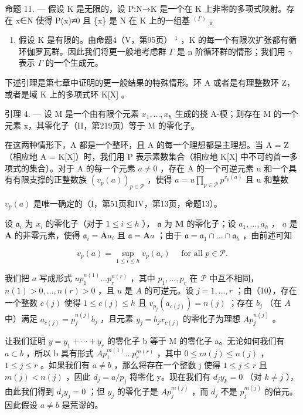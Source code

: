 命题 11. --- 假设 K 是无限的，设 P:N→K 是一个在 K 上非零的多项式映射。存在 x∈N 使得 P(x)≠0 且 \{x\} 是 N 在 K 上的一组基 \(^{(\Gamma)}\) 。

\begin{enumerate}
\def\labelenumi{\Alph{enumi})}
\setcounter{enumi}{1}
\tightlist
\item
  假设 K 是有限的。由命题4（V，第95页） \(^{1}\) ，K 的每一个有限次扩张都有循环伽罗瓦群。因此我们将更一般地考虑群 \(\Gamma\) 是 n 阶循环群的情形；我们用 \(\gamma\) 表示 \(\Gamma\) 的一个生成元。
\end{enumerate}

下述引理是第七章中证明的更一般结果的特殊情形。环 A 或者是有理整数环 Z，或者是域 K 上的多项式环 K{[}X{]} 。

引理 4. --- 设 M 是一个由有限个元素 \(x_{1}, \ldots, x_{h}\) 生成的挠 A-模；则存在 M 的一个元素 x，其零化子（II，第219页）等于 M 的零化子。

在这两种情形下，A 都是一个整环，且 A 的每一个理想都是主理想。当 A = Z（相应地 A = K{[}X{]}）时，我们用 P 表示素数集合（相应地 K{[}X{]} 中不可约首一多项式的集合）。对于 A 的每一个元素 \(a \neq 0\) ，存在 A 的一个可逆元素 u 和一个具有有限支撑的正整数族 \((v_{p}(a))_{p \in \mathcal{P}}\) ，使得 \(a = u \prod_{p \in \mathcal{P}} p^{v_{p}(a)}\) 且 u 和整数

\(v_{p}(a)\) 是唯一确定的（I，第51页和IV，第13页，命题13）。

设 \(\mathfrak{a}_i\) 为 \(x_i\) 的零化子（对于 \(1 \leqslant i \leqslant h\) ）， \(\mathfrak{a}\) 为 \(\mathbf{M}\) 的零化子；设 \(a_1, \ldots, a_h\) ， \(a\) 是 \(\mathbf{A}\) 的非零元素，使得 \(\mathfrak{a}_i = \mathbf{A}a_i\) 且 \(\mathfrak{a} = \mathbf{A}a\) ；由于 \(\mathfrak{a} = \mathfrak{a}_1 \cap \ldots \cap \mathfrak{a}_h\) ，由前述可知

\[
v _ {p} (a) = \sup _ {1 \leqslant i \leqslant h} v _ {p} (a _ {i}) \quad \text { for   all } p \in \mathscr {P}.\tag{10}
\]

我们把 \(a\) 写成形式 \(up_1^{n(1)} \ldots p_r^{n(r)}\) ，其中 \(p_1, \ldots, p_r\) 在 \(\mathcal{P}\) 中互不相同， \(n(1) > 0, \ldots, n(r) > 0\) ，且 \(u\) 是 \(A\) 的可逆元。设 \(j = 1, \ldots, r\) ；由（10），存在一个整数 \(c(j)\) 使得 \(1 \leqslant c(j) \leqslant h\) 且 \(v_{p_j}(a_{c(j)}) = n(j)\) ；存在 \(b_j\) （在 \(A\) 中）满足 \(a_{c(j)} = p_j^{n(j)}b_j\) ，且元素 \(y_j = b_jx_{c(j)}\) 的零化子为理想 \(Ap_j^{n(j)}\) 。

让我们证明 \(y = y_{1} + \cdots + y_{r}\) 的零化子 b 等于 M 的零化子 a。无论如何我们有 \(a \subset b\) ，所以 b 具有形式 \(Ap_{1}^{m(1)} \ldots p_{r}^{m(r)}\) ，其中 \(0 \leqslant m(j) \leqslant n(j)\) ， \(1 \leqslant j \leqslant r\) 。如果我们有 \(a \neq b\) ，那么将存在一个整数 j 使得 \(1 \leqslant j \leqslant r\) 且 \(m(j) < n(j)\) ，因此 \(d_{j} = a/p_{j}\) 将零化 y。现在我们有 \(d_{j}y_{k} = 0\) （对 \(k \neq j\) ），由此我们得到 \(d_{j}y_{j} = 0\) ；但 \(y_{j}\) 的零化子是 \(Ap_{j}^{m(j)}\) ，而 \(d_{j}\) 不是 \(p_{j}^{m(j)}\) 的倍元。因此假设 \(a \neq b\) 是荒谬的。

